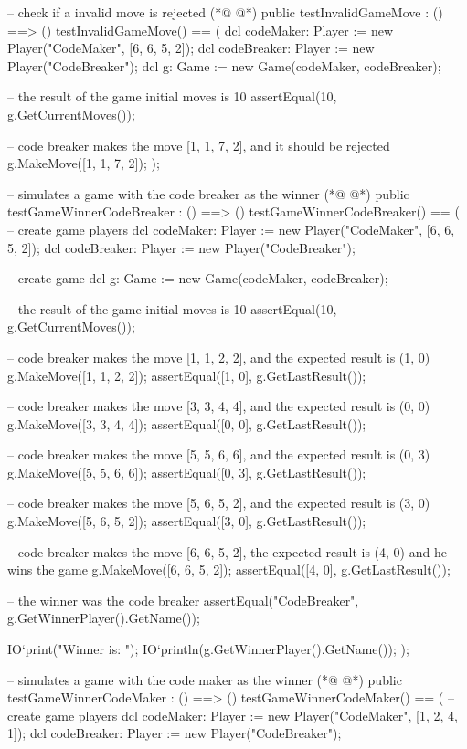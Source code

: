 \begin{vdmpp}[breaklines=true]
 -- check if a invalid move is rejected
(*@
\label{testInvalidGameMove:69}
@*)
 public testInvalidGameMove : () ==> ()
  testInvalidGameMove() == (
   dcl codeMaker: Player := new Player("CodeMaker", [6, 6, 5, 2]);
    dcl codeBreaker: Player := new Player("CodeBreaker");
    dcl g: Game := new Game(codeMaker, codeBreaker);
    
    -- the result of the game initial moves is 10
    assertEqual(10, g.GetCurrentMoves());
    
    -- code breaker makes the move [1, 1, 7, 2], and it should be rejected
    g.MakeMove([1, 1, 7, 2]);
  );

 -- simulates a game with the code breaker as the winner
(*@
\label{testGameWinnerCodeBreaker:83}
@*)
  public testGameWinnerCodeBreaker : () ==> ()
   testGameWinnerCodeBreaker() == (
    -- create game players
    dcl codeMaker: Player := new Player("CodeMaker", [6, 6, 5, 2]);
    dcl codeBreaker: Player := new Player("CodeBreaker");
    
    -- create game
    dcl g: Game := new Game(codeMaker, codeBreaker);
    
    -- the result of the game initial moves is 10
    assertEqual(10, g.GetCurrentMoves());
    
    -- code breaker makes the move [1, 1, 2, 2], and the expected result is (1, 0)
    g.MakeMove([1, 1, 2, 2]);
    assertEqual([1, 0], g.GetLastResult());
    
    -- code breaker makes the move [3, 3, 4, 4], and the expected result is (0, 0)
    g.MakeMove([3, 3, 4, 4]);
    assertEqual([0, 0], g.GetLastResult());
    
    -- code breaker makes the move [5, 5, 6, 6], and the expected result is (0, 3)
    g.MakeMove([5, 5, 6, 6]);
    assertEqual([0, 3], g.GetLastResult());
    
    -- code breaker makes the move [5, 6, 5, 2], and the expected result is (3, 0)
    g.MakeMove([5, 6, 5, 2]);
    assertEqual([3, 0], g.GetLastResult());
    
    -- code breaker makes the move [6, 6, 5, 2], the expected result is (4, 0) and he wins the game
    g.MakeMove([6, 6, 5, 2]);
    assertEqual([4, 0], g.GetLastResult());
    
    -- the winner was the code breaker
    assertEqual("CodeBreaker", g.GetWinnerPlayer().GetName());
    
    IO`print("Winner is: ");
    IO`println(g.GetWinnerPlayer().GetName());
   );
   
   -- simulates a game with the code maker as the winner
(*@
\label{testGameWinnerCodeMaker:123}
@*)
   public testGameWinnerCodeMaker : () ==> ()
   testGameWinnerCodeMaker() == (
    -- create game players
    dcl codeMaker: Player := new Player("CodeMaker", [1, 2, 4, 1]);
    dcl codeBreaker: Player := new Player("CodeBreaker");
    

\end{vdmpp}
